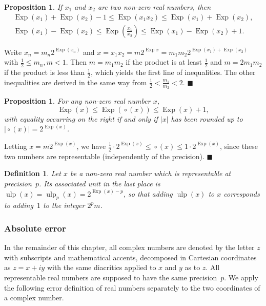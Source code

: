\documentclass [11pt]{article}
\newcommand {\Ulp}{{\operatorname {ulp}}}
\DeclareMathOperator{\Exp}{\operatorname {Exp}}
\newcommand {\round}{\operatorname {\circ}}
\renewcommand {\leq}{\leqslant}
\newtheorem{definition}[theorem]{Definition}
\newtheorem{prop}[theorem]{Proposition}
\newenvironment{proof}{\noindent{\bf Proof:}}{{\hspace* {\fill}$\blacksquare$}}
\begin{document}
\begin {prop}
\label {prop:expmuldiv}
If $x_1$ and $x_2$ are two non-zero real numbers, then
\begin {gather*}
\Exp (x_1) + \Exp (x_2) - 1 \leq \Exp (x_1 x_2) \leq \Exp (x_1) + \Exp (x_2),
\\
\Exp (x_1) - \Exp (x_2) \leq \Exp \left( \frac {x_1}{x_2} \right)
\leq \Exp (x_1) - \Exp (x_2) + 1.
\end {gather*}
\end {prop}

\begin {proof}
Write $x_n = m_n 2^{\Exp (x_n)}$ and
$x = x_1 x_2 = m 2^{\Exp x} = m_1 m_2 2^{\Exp (x_1) + \Exp (x_2)}$
with $\frac {1}{2} \leq m_n, m < 1$.
Then $m = m_1 m_2$ if the product is at least $\frac {1}{2}$ and
$m = 2 m_1 m_2$ if the product is less than $\frac {1}{2}$, which
yields the first line of inequalities.
The other inequalities are derived in the same way from
$\frac {1}{2} < \frac {m_1}{m_2} < 2$.
\end {proof}


\begin {prop}
\label {prop:expround}
For any non-zero real number $x$,
\[
\Exp (x) \leq \Exp (\round (x)) \leq \Exp (x) + 1,
\]
with equality occurring on the right if and only if
$|x|$ has been rounded up to $|\round (x)| = 2^{\Exp (x)}$.
\end {prop}

\begin {proof}
Letting $x = m 2^{\Exp (x)}$, we have
$\frac {1}{2} \cdot 2^{\Exp (x)} \leq \round (x) \leq 1 \cdot 2^{\Exp (x)}$,
since these two numbers are representable (independently of the precision).
\end {proof}


\begin {definition}
\label {def:ulp}
Let $x$ be a non-zero real number which is representable at precision~$p$.
Its associated {\em unit in the last place} is
$\Ulp(x) = \Ulp_p (x) = 2^{\Exp(x) - p}$, so that adding $\Ulp(x)$ to $x$
corresponds to adding~$1$ to the integer $2^p m$.
\end {definition}


\subsubsection {Absolute error}

In the remainder of this chapter, all complex numbers are denoted by
the letter $z$ with subscripts and mathematical accents, decomposed in
Cartesian coordinates as $z = x + i y$ with the same diacritics applied
to $x$ and $y$ as to $z$. All representable real numbers are supposed
to have the same precision~$p$. We apply the following error definition
of real numbers separately to the two coordinates of a complex number.
\end{document}
